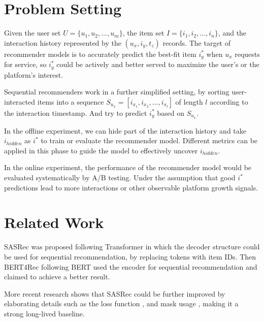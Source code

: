 \documentclass{article}
\begin{document}


\section{Problem Setting}

Given the user set $U = \{u_1, u_2, ..., u_m\}$, the item set $I = \{i_1, i_2, ..., i_n\}$, and the interaction history represented by the $(u_x, i_y, t_z)$ records. The target of recommender models is to accurately predict the best-fit item $i_y^*$ when $u_x$ requests for service, so $i_y^*$ could be actively and better served to maximize the user's or the platform's interest.

Sequential recommenders work in a further simplified setting, by sorting user-interacted items into a sequence $S_{u_x} = [i_{x_1}, i_{x_2}, ..., i_{x_{l}}]$ of length $l$ according to the interaction timestamp. And try to predict $i_y^*$ based on $S_{u_x}$.

In the offline experiment, we can hide part of the interaction history and take $i_{hidden}$ as $i^*$ to train or evaluate the recommender model. Different metrics can be applied in this phase to guide the model to effectively uncover $i_{hidden}$.

In the online experiment, the performance of the recommender model would be evaluated systematically by A/B testing. Under the assumption that good $i^*$ predictions lead to more interactions or other observable platform growth signals.

\section{Related Work}

SASRec\cite{sasrec} was proposed following Transformer\cite{transformer} in which the decoder structure could be used for sequential recommendation, by replacing tokens with item IDs. Then BERT4Rec\cite{bert4rec} following BERT\cite{bert} used the encoder for sequential recommendation and claimed to achieve a better result.

More recent research shows that SASRec could be further improved by elaborating details such as the loss function \cite{gold}, and mask usage \cite{visa}, making it a strong long-lived baseline.%
\end{document}
